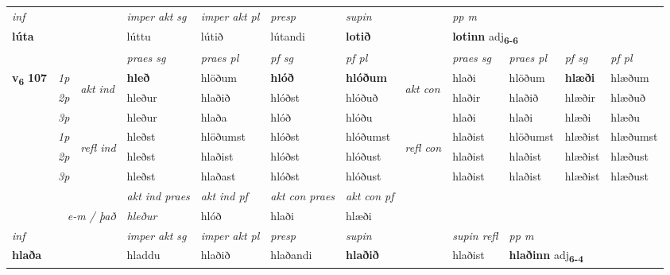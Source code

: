 \begin{longtable}[l]{X>{\footnotesize\itshape}llXXXXlXXXX}
   {\textit{inf}} & &  & \textit{imper akt sg} & \textit{imper akt pl}   & \textit{presp} & \textit{supin}  && \textit{pp m} \\*
  {\textbf{lúta}} & && lúttu  & lútið   & lútandi &  \textbf{lotið}  && \multicolumn{2}{l}{\textbf{lotinn} adj\textbf{\textsubscript{6-6}}} \\*

\midrule

 & &   & \textit{praes sg}  & \textit{praes pl}    & \textit{ pf sg} & \textit{pf pl} & & \textit{praes sg}  & \textit{praes pl}    & \textit{pf sg} & \textit{pf pl }  \\ \cmidrule{4-7} \cmidrule{9-12}
 \multirow{2}{*}{{{\textbf{v{\textsubscript{6}}} \Large{\textbf{107}}}}}  & 1p & \multirow{3}{*}{\begin{turn}{90}\textit{akt ind}\end{turn}} & \textbf{hleð} & hlöðum & \textbf{hlóð} & \textbf{hlóðum} & \multirow{3}{*}{\begin{turn}{90}\textit{akt con}\end{turn}} &hlaði & hlöðum & \textbf{hlæði} & hlæðum\\*
 & 2p &  &  hleður  & hlaðið & hlóðst & hlóðuð & & hlaðir & hlaðið & hlæðir & hlæðuð \\*
 & 3p &  & hleður & hlaða & hlóð & hlóðu & & hlaði & hlaði& hlæði & hlæðu \\*
\cmidrule{4-7} \cmidrule{9-12}
 & 1p & \multirow{3}{*}{\begin{turn}{90}\textit{refl ind}\end{turn}}  & hleðst & hlöðumst & hlóðst & hlóðumst & \multirow{3}{*}{\begin{turn}{90}\textit{refl con}\end{turn}}  &hlaðist & hlöðumst & hlæðist & hlæðumst \\*
 & 2p &  & hleðst & hlaðist & hlóðst & hlóðust & &hlaðist & hlaðist & hlæðist & hlæðust \\*
 & 3p  & & hleðst & hlaðast & hlóðst & hlóðust & & hlaðist & hlaðist& hlæðist & hlæðust \\*
\cmidrule{4-7} \cmidrule{9-12}

   && &  \textit{akt ind praes} & \textit{akt ind pf} & \textit{akt con praes} & \textit{akt con pf} \\*
\multicolumn{3}{r}{\textit{e-m / það}} & hleður & hlóð & hlaði & hlæði \\*

\cmidrule{4-7}
   {\textit{inf}} & &  & \textit{imper akt sg} & \textit{imper akt pl}   & \textit{presp} & \textit{supin} && \textit{supin refl} & \textit{pp m} \\*
  {\textbf{hlaða}} & && hladdu  & hlaðið   & hlaðandi &  \textbf{hlaðið} && hlaðist & \multicolumn{2}{l}{\textbf{hlaðinn} adj\textbf{\textsubscript{6-4}}} \\*


\end{longtable}
